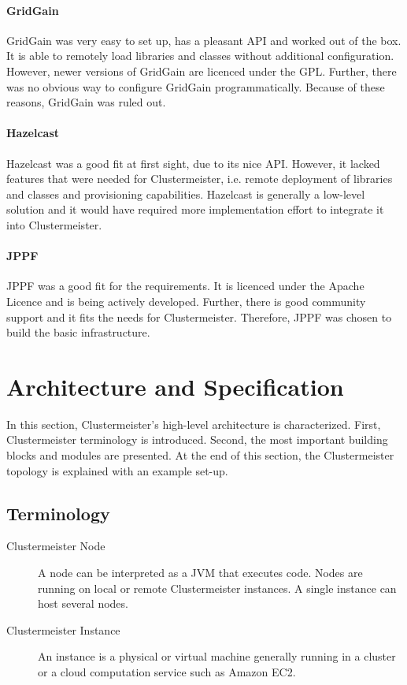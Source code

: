 \documentclass[english]{uzhpub}
\begin{document}
\paragraph{GridGain} GridGain was very easy to set up, has a pleasant API and worked out of the box. It is able to remotely load libraries and classes without additional configuration. However, newer versions of GridGain are licenced under the GPL. Further, there was no obvious way to configure GridGain programmatically. Because of these reasons, GridGain was ruled out.

\paragraph{Hazelcast} Hazelcast was a good fit at first sight, due to its nice API. However, it lacked features that were needed for Clustermeister, i.e. remote deployment of libraries and classes and provisioning capabilities. Hazelcast is generally a low-level solution and it would have required more implementation effort to integrate it into Clustermeister.

\paragraph{JPPF} JPPF was a good fit for the requirements. It is licenced under the Apache Licence and is being actively developed. Further, there is good community support and it fits the needs for Clustermeister. Therefore, JPPF was chosen to build the basic infrastructure.

\section{Architecture and Specification}
\label{architecture}

In this section, Clustermeister's high-level architecture is characterized. First, Clustermeister terminology is introduced. Second, the most important building blocks and modules are presented. At the end of this section, the Clustermeister topology is explained with an example set-up.

\subsection{Terminology}

\begin{description}
\item[Clustermeister Node] A node can be interpreted as a JVM that executes code. Nodes are running on local or remote Clustermeister instances. A single instance can host several nodes.
\item[Clustermeister Instance] An instance is a physical or virtual machine generally running in a cluster or a cloud computation service such as Amazon EC2.
\end{description}
\end{document}
